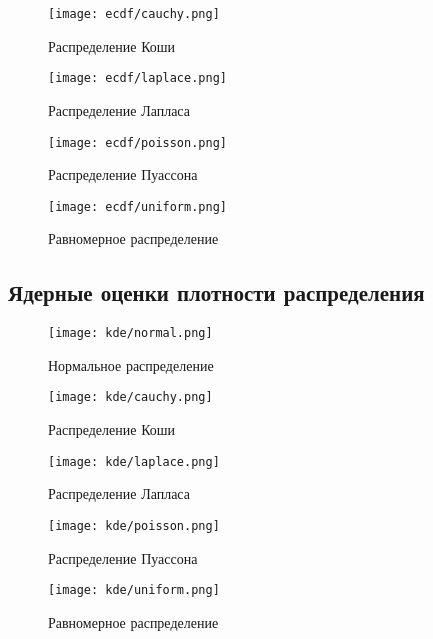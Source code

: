 \documentclass[12pt,a4paper]{article}
\begin{document}
\begin{figure}[h!]
	\centering
	\texttt{[image: ecdf/cauchy.png]}
	\caption{Распределение Коши}
	\label{fig:image}
\end{figure}
\pagebreak

\begin{figure}[h!]
	\centering
	\texttt{[image: ecdf/laplace.png]}
	\caption{Распределение Лапласа}
	\label{fig:image}
\end{figure}

\begin{figure}[h!]
	\centering
	\texttt{[image: ecdf/poisson.png]}
	\caption{Распределение Пуассона}
	\label{fig:image}
\end{figure}
\pagebreak

\begin{figure}[h!]
	\centering
	\texttt{[image: ecdf/uniform.png]}
	\caption{Равномерное распределение}
	\label{fig:image}
\end{figure}
\pagebreak

\subsection{Ядерные оценки плотности распределения}
\begin{figure}[h!]
	\centering
	\texttt{[image: kde/normal.png]}
	\caption{Нормальное распределение}
	\label{fig:image}
\end{figure}
\pagebreak

\begin{figure}[h!]
	\centering
	\texttt{[image: kde/cauchy.png]}
	\caption{Распределение Коши}
	\label{fig:image}
\end{figure}
\pagebreak

\begin{figure}[h!]
	\centering
	\texttt{[image: kde/laplace.png]}
	\caption{Распределение Лапласа}
	\label{fig:image}
\end{figure}
\pagebreak

\begin{figure}[h!]
	\centering
	\texttt{[image: kde/poisson.png]}
	\caption{Распределение Пуассона}
	\label{fig:image}
\end{figure}
\pagebreak

\begin{figure}[h!]
	\centering
	\texttt{[image: kde/uniform.png]}
	\caption{Равномерное распределение}
	\label{fig:image}
\end{figure}
\pagebreak
\end{document}
